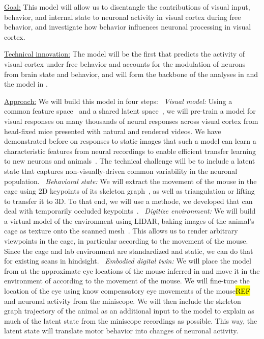 \documentclass[COG,11pt]{ercgrant}
\begin{document}
\underline{Goal:} This model will allow us to disentangle the contributions of visual input, behavior, and internal state to neuronal activity in visual cortex during free behavior, and investigate how behavior influences neuronal processing in visual cortex.
  
\underline{Technical innovation:} The model will be the first that predicts the activity of visual cortex under free behavior and accounts for the modulation of neurons from brain state and behavior, and will form the backbone of the analyses in  and the model in .

\underline{Approach:} We will build this model in four steps: ~\textit{Visual model:} Using a common feature space~\parencite{Sinz2018-sk} and a shared latent space~\parencite{Bashiri2021-or}, we will pre-train a model for visual responses on many thousands of neural responses across visual cortex from head-fixed mice presented with natural and rendered videos. 
We have demonstrated before on responses to static images that such a model can learn a characteristic features from neural recordings to enable efficient transfer learning to new neurons and animals~\parencite{Lurz2020-ua}. The technical challenge will be to include a latent state that captures non-visually-driven common variability in the neuronal population. ~\textit{Behavioral state:} 
We will extract the movement of the mouse in the cage using 2D keypoints of its skeleton graph~\parencite{Mathis2018-lk}, as well as triangulation or lifting to transfer it to 3D. 
To that end, we will use a methode, we developed that can deal with temporarily occluded keypoints~\parencite{Pierzchlewicz2022-tq}.
~\textit{Digitize environment:} 
We will build a virtual model of the environment using LIDAR, baking images of the animal's cage as texture onto the scanned mesh~\parencite[similar as in][]{Holmgren2021-jv}.
This allows us to render arbitrary viewpoints in the cage, in particular according to the movement of the mouse.
Since the cage and lab environment are standardized and static, we can do that for existing scans in hindsight.
~\textit{Embodied digital twin:} 
We will place the model from  at the approximate eye locations of the mouse inferred in  and move it in the environment of  according to the movement of the mouse. 
We will fine-tune the location of the eye using know compensatory eye movements of the mouse\hl{REF} and neuronal activity from the miniscope.
We will then include the skeleton graph trajectory of the animal as an additional input to the model to explain as much of the latent state from the miniscope recordings as possible. 
This way, the latent state will translate motor behavior into changes of neuronal activity.
\end{document}
